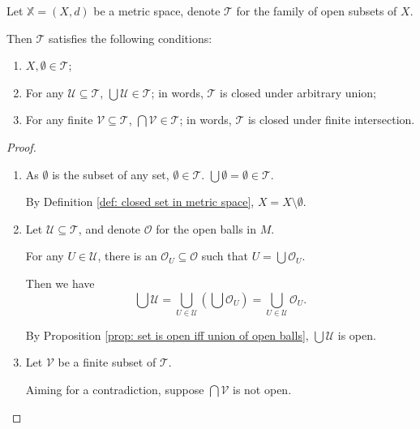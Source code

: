 \begin{proposition}
	Let $\mathbb X = (X, d)$ be a metric space, denote $\mathcal T$ for the family of open subsets of $X$.
	
	Then $\mathcal T$ satisfies the following conditions:
	
	\begin{enumerate}[\bf O1.]
		\item $X, \emptyset \in \mathcal T$;
		\item For any $\mathcal U \subseteq \mathcal T$, $\bigcup \mathcal U \in \mathcal T$; in words, $\mathcal T$ is closed under arbitrary union;
		\item For any finite $\mathcal V \subseteq \mathcal T$, $\bigcap \mathcal V \in \mathcal T$; in words, $\mathcal T$ is closed under finite intersection.
	\end{enumerate}
	
	\begin{proof} \
		\begin{enumerate}[\bf O1.]
			\item
				As $\emptyset$ is the subset of any set, $\emptyset \in \mathcal T$. $\bigcup \emptyset = \emptyset \in \mathcal T$.
			
				By Definition \ref{def: closed set in metric space}, $X = X \setminus \emptyset$.
				
				\qedlm
				
			\item 
				Let $\mathcal U \subseteq \mathcal T$, and denote $\mathcal O$ for the open balls in $M$.
			
				For any $U \in \mathcal U$, there is an $\mathcal O_U \subseteq \mathcal O$ such that $U = \bigcup \mathcal O_U$. 
				
				Then we have
				$$
				\bigcup \mathcal U = \bigcup_{U \in \mathcal U} \left( \bigcup \mathcal O_U \right) = \bigcup_{U \in \mathcal U} \mathcal O_U.
				$$
				
				By Proposition \ref{prop: set is open iff union of open balls}, $\bigcup \mathcal U$ is open.
				
				\qedlm
				
			\item
				Let $\mathcal V$ be a finite subset of $\mathcal T$.
				
				Aiming for a contradiction, suppose $\bigcap \mathcal V$ is not open.
				

\end{enumerate}
\end{proof}
\end{proposition}
